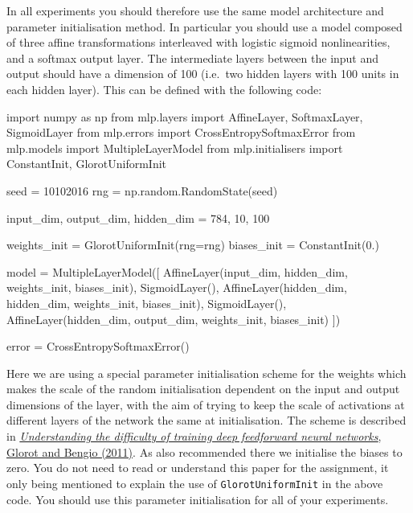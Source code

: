\documentclass[11pt,]{article}
\newenvironment{Shaded}{}{}
\newcommand{\DecValTok}[1]{\textcolor[rgb]{0.25,0.63,0.44}{{#1}}}
\newcommand{\CharTok}[1]{\textcolor[rgb]{0.25,0.44,0.63}{{#1}}}
\newcommand{\NormalTok}[1]{{#1}}
\begin{document}
In all experiments you should therefore use the same model architecture
and parameter initialisation method. In particular you should use a
model composed of three affine transformations interleaved with logistic
sigmoid nonlinearities, and a softmax output layer. The intermediate
layers between the input and output should have a dimension of 100
(i.e.~two hidden layers with 100 units in each hidden layer). This can
be defined with the following code:

\begin{Shaded}
\begin{Highlighting}[]
\CharTok{import} \NormalTok{numpy }\CharTok{as} \NormalTok{np}
\CharTok{from} \NormalTok{mlp.layers }\CharTok{import} \NormalTok{AffineLayer, SoftmaxLayer, SigmoidLayer}
\CharTok{from} \NormalTok{mlp.errors }\CharTok{import} \NormalTok{CrossEntropySoftmaxError}
\CharTok{from} \NormalTok{mlp.models }\CharTok{import} \NormalTok{MultipleLayerModel}
\CharTok{from} \NormalTok{mlp.initialisers }\CharTok{import} \NormalTok{ConstantInit, GlorotUniformInit}

\NormalTok{seed = }\DecValTok{10102016}
\NormalTok{rng = np.random.RandomState(seed)}

\NormalTok{input_dim, output_dim, hidden_dim = }\DecValTok{784}\NormalTok{, }\DecValTok{10}\NormalTok{, }\DecValTok{100}

\NormalTok{weights_init = GlorotUniformInit(rng=rng)}
\NormalTok{biases_init = ConstantInit(}\DecValTok{0}\NormalTok{.)}

\NormalTok{model = MultipleLayerModel([}
    \NormalTok{AffineLayer(input_dim, hidden_dim, weights_init, biases_init),}
    \NormalTok{SigmoidLayer(),}
    \NormalTok{AffineLayer(hidden_dim, hidden_dim, weights_init, biases_init),}
    \NormalTok{SigmoidLayer(),}
    \NormalTok{AffineLayer(hidden_dim, output_dim, weights_init, biases_init)}
\NormalTok{])}

\NormalTok{error = CrossEntropySoftmaxError()}
\end{Highlighting}
\end{Shaded}

Here we are using a special parameter initialisation scheme for the
weights which makes the scale of the random initialisation dependent on
the input and output dimensions of the layer, with the aim of trying to
keep the scale of activations at different layers of the network the
same at initialisation. The scheme is described in
\href{http://jmlr.org/proceedings/papers/v9/glorot10a/glorot10a.pdf}{\emph{Understanding
the difficulty of training deep feedforward neural networks}, Glorot and
Bengio (2011)}. As also recommended there we initialise the biases to
zero. You do not need to read or understand this paper for the
assignment, it only being mentioned to explain the use of
\texttt{GlorotUniformInit} in the above code. You should use this
parameter initialisation for all of your experiments.
\end{document}
